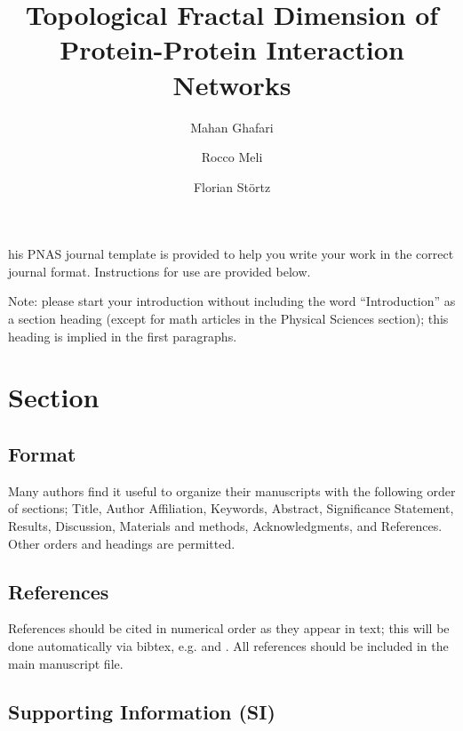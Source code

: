 \documentclass[9pt,twocolumn,twoside,lineno]{pnas-new}
\title{Topological Fractal Dimension of Protein-Protein Interaction Networks}
\author[a]{Mahan Ghafari}
\author[a]{Rocco Meli}
\author[a]{Florian St{\"o}rtz}
\affil[a]{Interdisciplinary Bioscience DTP, Rex Richards Building, Parks Road, University of Oxford}
\begin{document}
\maketitle
\thispagestyle{firststyle}

his PNAS journal template is provided to help you write your work in the correct journal format.  Instructions for use are provided below.

Note: please start your introduction without including the word ``Introduction'' as a section heading (except for math articles in the Physical Sciences section); this heading is implied in the first paragraphs.

\section*{Section}

\subsection*{Format}

Many authors find it useful to organize their manuscripts with the following order of sections;  Title, Author Affiliation, Keywords, Abstract, Significance Statement, Results, Discussion, Materials and methods, Acknowledgments, and References. Other orders and headings are permitted.

\subsection*{References}

References should be cited in numerical order as they appear in text; this will be done automatically via bibtex, e.g. \cite{belkin2002using} and \cite{berard1994embedding,coifman2005geometric}. All references should be included in the main manuscript file.

\subsection*{Supporting Information (SI)}
\end{document}
